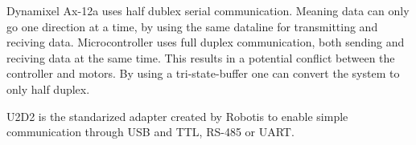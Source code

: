 


Dynamixel Ax-12a uses half dublex serial communication. Meaning data can only go one direction at a time, by using the same dataline for transmitting and reciving data.
Microcontroller uses full duplex communication, both sending and reciving data at the same time. This results in a potential conflict between the controller and motors.
By using a tri-state-buffer one can convert the system to only half duplex. %




U2D2 is the standarized adapter created by Robotis to enable simple communication through USB and TTL, RS-485 or UART. 
